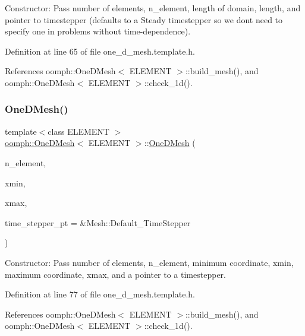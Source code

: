 Constructor\+: Pass number of elements, n\+\_\+element, length of domain, length, and pointer to timestepper (defaults to a Steady timestepper so we don\textquotesingle{}t need to specify one in problems without time-\/dependence). 



Definition at line 65 of file one\+\_\+d\+\_\+mesh.\+template.\+h.



References oomph\+::\+One\+D\+Mesh$<$ E\+L\+E\+M\+E\+N\+T $>$\+::build\+\_\+mesh(), and oomph\+::\+One\+D\+Mesh$<$ E\+L\+E\+M\+E\+N\+T $>$\+::check\+\_\+1d().

\mbox{\label{classoomph_1_1OneDMesh_a1a8b9e65226f10dfbb48fe2362e83014}} 
\subsubsection{\texorpdfstring{One\+D\+Mesh()}{OneDMesh()}\hspace{0.1cm}{\footnotesize\ttfamily [2/2]}}
{\footnotesize\ttfamily template$<$class E\+L\+E\+M\+E\+NT $>$ \\
\hyperlink{classoomph_1_1OneDMesh}{oomph\+::\+One\+D\+Mesh}$<$ E\+L\+E\+M\+E\+NT $>$\+::\hyperlink{classoomph_1_1OneDMesh}{One\+D\+Mesh} (\begin{DoxyParamCaption}\item[{const unsigned \&}]{n\+\_\+element,  }\item[{const double \&}]{xmin,  }\item[{const double \&}]{xmax,  }\item[{Time\+Stepper $\ast$}]{time\+\_\+stepper\+\_\+pt = {\ttfamily \&Mesh\+:\+:Default\+\_\+TimeStepper} }\end{DoxyParamCaption})\hspace{0.3cm}{\ttfamily [inline]}}



Constructor\+: Pass number of elements, n\+\_\+element, minimum coordinate, xmin, maximum coordinate, xmax, and a pointer to a timestepper. 



Definition at line 77 of file one\+\_\+d\+\_\+mesh.\+template.\+h.



References oomph\+::\+One\+D\+Mesh$<$ E\+L\+E\+M\+E\+N\+T $>$\+::build\+\_\+mesh(), and oomph\+::\+One\+D\+Mesh$<$ E\+L\+E\+M\+E\+N\+T $>$\+::check\+\_\+1d().



